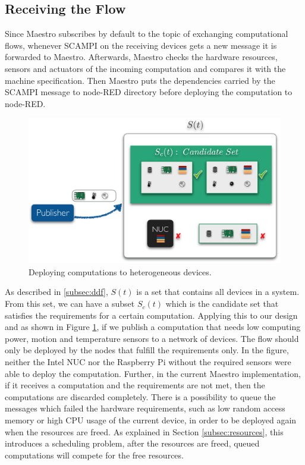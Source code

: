 \subsection{Receiving the Flow}
Since Maestro subscribes  by default  to the topic of exchanging computational flows, whenever SCAMPI on the receiving devices gets a new message it  is forwarded to Maestro. Afterwards, Maestro checks the hardware resources, sensors and actuators of the incoming computation and compares it with the machine specification. Then Maestro puts the dependencies carried by the SCAMPI message to node-RED directory before deploying the computation to node-RED.  \\




\begin{figure}[H]
	\centering
	\includegraphics[scale=0.6]{images/sets.png}
	\caption{Deploying computations to heterogeneous devices.}
	\label{fig:sets}
\end{figure}

\noindent As described in \ref{subsec:ddf}, $S(t)$ is a set that contains all devices in a system. From this set, we can have a subset $S_c(t)$ which is the candidate set that satisfies the requirements for a certain computation.  Applying this to our design and as shown in Figure \ref{fig:sets}, if we publish a computation that needs low computing  power, motion and temperature sensors to a network of devices. The flow should only be deployed by the nodes that fulfill the requirements only. In the figure, neither the Intel NUC nor the Raspberry Pi without the required sensors were able to deploy the computation. Further, in the current Maestro implementation, if it receives a computation and  the requirements  are not met, then the computations are discarded completely. There is a possibility to queue the  messages which failed the hardware requirements, such as low random access memory or high CPU usage of the current device, in order to be deployed again when the resources are freed.  As explained in Section \ref{subsec:resources}, this introduces a scheduling problem, after the resources are freed, queued computations will compete for the free resources.







